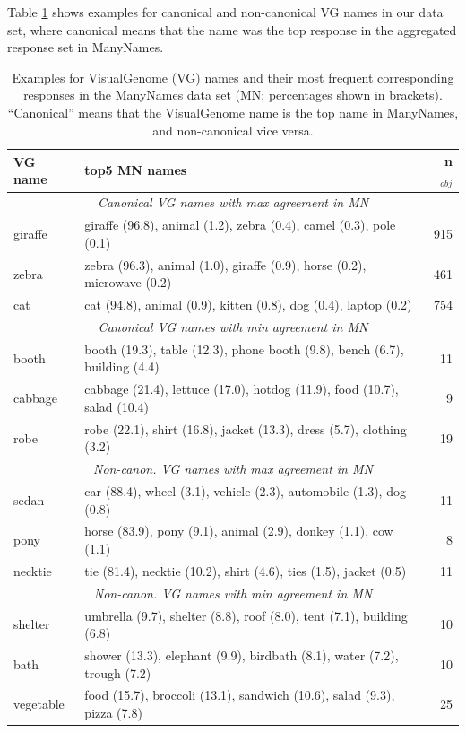  Table \ref{tab:qual} shows examples for canonical and non-canonical VG names in our data set, where canonical means that the name was the top response in the aggregated response set in ManyNames.

\begin{table}
\small
\begin{tabular}{lp{4.8cm}r}
\toprule
VG name &  top5 MN names &  n$_{obj}$  \\
\midrule
\multicolumn{3}{c}{\it Canonical VG names with max agreement in MN}\\
 giraffe &  giraffe (96.8), animal (1.2), zebra (0.4), camel (0.3), pole (0.1) &  915 \\
 zebra &  zebra (96.3), animal (1.0), giraffe (0.9), horse (0.2), microwave (0.2) &  461  \\
 cat &  cat (94.8), animal (0.9), kitten (0.8), dog (0.4), laptop (0.2) &  754\\
\midrule
\multicolumn{3}{c}{\it Canonical VG names with min agreement in MN}\\
 booth &  booth (19.3), table (12.3), phone booth (9.8), bench (6.7), building (4.4) &  11 \\
 cabbage &  cabbage (21.4), lettuce (17.0), hotdog (11.9), food (10.7), salad (10.4) &  9 \\
 robe &  robe (22.1), shirt (16.8), jacket (13.3), dress (5.7), clothing (3.2) &  19 \\
  \midrule
  \multicolumn{3}{c}{\it Non-canon. VG names with max agreement in MN}\\
 sedan &  car (88.4), wheel (3.1), vehicle (2.3), automobile (1.3), dog (0.8) &  11 \\
 pony &  horse (83.9), pony (9.1), animal (2.9), donkey (1.1), cow (1.1) &  8 \\
 necktie &  tie (81.4), necktie (10.2), shirt (4.6), ties (1.5), jacket (0.5) &  11 \\
 \midrule
   \multicolumn{3}{c}{\it Non-canon. VG names with min agreement in MN}\\
 shelter &  umbrella (9.7), shelter (8.8), roof (8.0), tent (7.1), building (6.8) &  10 \\
 bath &  shower (13.3), elephant (9.9), birdbath (8.1), water (7.2), trough (7.2) &  10 \\
 vegetable &  food (15.7), broccoli (13.1), sandwich (10.6), salad (9.3), pizza (7.8) &  25 \\
\bottomrule
\end{tabular}
\caption{Examples for VisualGenome (VG) names and their most frequent corresponding responses in the ManyNames data set (MN; percentages shown in brackets). ``Canonical'' means that the VisualGenome name is the top name in ManyNames, and non-canonical vice versa.}
\label{tab:qual}
\end{table}

